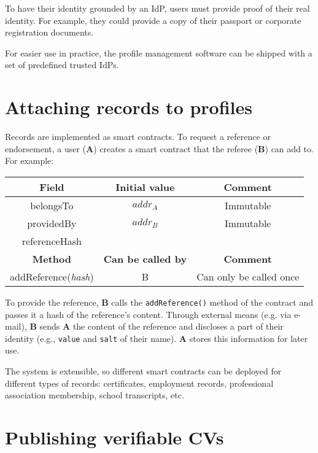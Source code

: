 \documentclass[a4paper, bibliography=totoc, titlepage=false]{scrartcl}
\begin{document}
To have their identity grounded by an IdP, users must provide proof of their real identity. For example, they could provide a copy of their passport or corporate registration documents.

For easier use in practice, the profile management software can be shipped with a set of predefined trusted IdPs.

\section{Attaching records to profiles}

Records are implemented as smart contracts. To request a reference or endorsement, a user (\textbf{A}) creates a smart contract that the referee (\textbf{B}) can add to. For example:

\begin{center}
\begin{tabular}{|c|c|c|}
	\hline
	\textbf{Field} & \textbf{Initial value} & \textbf{Comment} \\
	\hline
	belongsTo & $addr_{A}$ & Immutable\\
	\hline
	providedBy & $addr_{B}$ & Immutable\\
	\hline	
	referenceHash &  & \\
	\hline
	
	\textbf{Method} & \textbf{Can be called by} & \textbf{Comment}  \\
	\hline
	addReference(\emph{hash}) & B & Can only be called once \\
	\hline
\end{tabular}
\end{center}

To provide the reference, \textbf{B} calls the \texttt{addReference()} method of the contract and passes it a hash of the reference's content. Through external means (e.g. via e-mail), \textbf{B} sends \textbf{A} the content of the reference and discloses a part of their identity (e.g., \texttt{value} and \texttt{salt} of their name). \textbf{A} stores this information for later use.

The system is extensible, so different smart contracts can be deployed for different types of records: certificates, employment records, professional association membership, school transcripts, etc.

\section{Publishing verifiable CVs}
\end{document}
